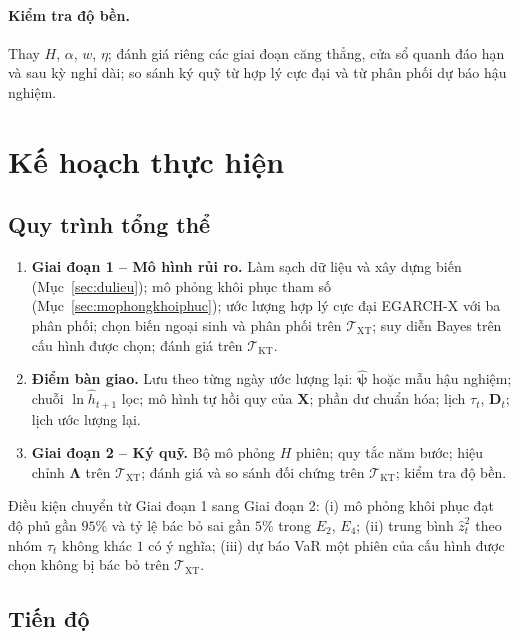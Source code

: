 \documentclass[12pt,a4paper]{article}
\theoremstyle{definition}
\theoremstyle{remark}
\newcommand{\bpsi}{\boldsymbol{\psi}}
\newcommand{\bLambda}{\boldsymbol{\Lambda}}
\newcommand{\bX}{\mathbf{X}}
\newcommand{\bD}{\mathbf{D}}
\begin{document}
\paragraph{Kiểm tra độ bền.} Thay $H$, $\alpha$, $w$, $\eta$; đánh giá riêng các giai đoạn căng thẳng, cửa sổ quanh đáo hạn và sau kỳ nghỉ dài; so sánh ký quỹ từ hợp lý cực đại và từ phân phối dự báo hậu nghiệm.

\section{Kế hoạch thực hiện}\label{sec:kehoach}

\subsection{Quy trình tổng thể}

\begin{enumerate}
\item \textbf{Giai đoạn 1 -- Mô hình rủi ro.} Làm sạch dữ liệu và xây dựng biến (Mục~\ref{sec:dulieu}); mô phỏng khôi phục tham số (Mục~\ref{sec:mophongkhoiphuc}); ước lượng hợp lý cực đại EGARCH-X với ba phân phối; chọn biến ngoại sinh và phân phối trên $\mathcal T_{\mathrm{XT}}$; suy diễn Bayes trên cấu hình được chọn; đánh giá trên $\mathcal T_{\mathrm{KT}}$.
\item \textbf{Điểm bàn giao.} Lưu theo từng ngày ước lượng lại: $\hat{\bpsi}$ hoặc mẫu hậu nghiệm; chuỗi $\ln\hat h_{t+1}$ lọc; mô hình tự hồi quy của $\bX$; phần dư chuẩn hóa; lịch $\tau_t$, $\bD_t$; lịch ước lượng lại.
\item \textbf{Giai đoạn 2 -- Ký quỹ.} Bộ mô phỏng $H$ phiên; quy tắc năm bước; hiệu chỉnh $\bLambda$ trên $\mathcal T_{\mathrm{XT}}$; đánh giá và so sánh đối chứng trên $\mathcal T_{\mathrm{KT}}$; kiểm tra độ bền.
\end{enumerate}

Điều kiện chuyển từ Giai đoạn 1 sang Giai đoạn 2: (i) mô phỏng khôi phục đạt độ phủ gần $95\%$ và tỷ lệ bác bỏ sai gần $5\%$ trong $E_2$, $E_4$; (ii) trung bình $\hat z_t^2$ theo nhóm $\tau_t$ không khác $1$ có ý nghĩa; (iii) dự báo VaR một phiên của cấu hình được chọn không bị bác bỏ trên $\mathcal T_{\mathrm{XT}}$.

\subsection{Tiến độ}
\end{document}
